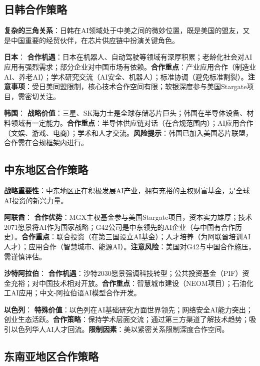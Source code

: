\subsection{日韩合作策略}

\textbf{复杂的三角关系}：日韩在AI领域处于中美之间的微妙位置，既是美国的盟友，又是中国重要的经贸伙伴，在芯片供应链中扮演关键角色。

\textbf{日本}：
\textbf{合作机遇}：日本在机器人、自动驾驶等领域有深厚积累；老龄化社会对AI应用有强烈需求；部分企业对中国市场有依赖。\textbf{合作重点}：产业应用合作（制造业AI、养老AI）；学术研究交流（AI安全、机器人）；标准协调（避免标准割裂）。\textbf{注意事项}：受日美同盟限制，核心技术合作空间有限；软银深度参与美国Stargate项目，需密切关注。

\textbf{韩国}：
\textbf{战略价值}：三星、SK海力士是全球存储芯片巨头；韩国在半导体设备、材料领域有一定能力。\textbf{合作重点}：半导体供应链对话（在合规范围内）；AI应用合作（文娱、游戏、电商）；学术和人才交流。\textbf{风险提示}：韩国已加入美国芯片联盟，合作需在合规框架内进行。

\subsection{中东地区合作策略}

\textbf{战略重要性}：中东地区正在积极发展AI产业，拥有充裕的主权财富基金，是全球AI投资的新兴力量。

\textbf{阿联酋}：
\textbf{合作优势}：MGX主权基金参与美国Stargate项目，资本实力雄厚；技术2071愿景将AI作为国家战略；G42公司是中东领先的AI企业（与中国有合作历史）。\textbf{合作重点}：联合投资（在第三国设立AI基金）；人才培养（为阿联酋培训AI人才）；应用合作（智慧城市、能源AI）。\textbf{注意风险}：美国对G42与中国合作施压，需谨慎评估。

\textbf{沙特阿拉伯}：
\textbf{合作机遇}：沙特2030愿景强调科技转型；公共投资基金（PIF）资金充裕；对中国技术相对开放。\textbf{合作重点}：智慧城市建设（NEOM项目）；石油化工AI应用；中文-阿拉伯语AI模型合作开发。

\textbf{以色列}：
\textbf{特殊价值}：以色列在AI基础研究方面世界领先；网络安全AI能力突出；创业生态活跃。\textbf{合作策略}：保持学术层面交流；通过第三方渠道了解技术趋势；吸引以色列华人AI人才回流。\textbf{限制因素}：美以紧密关系限制深度合作空间。

\subsection{东南亚地区合作策略}

